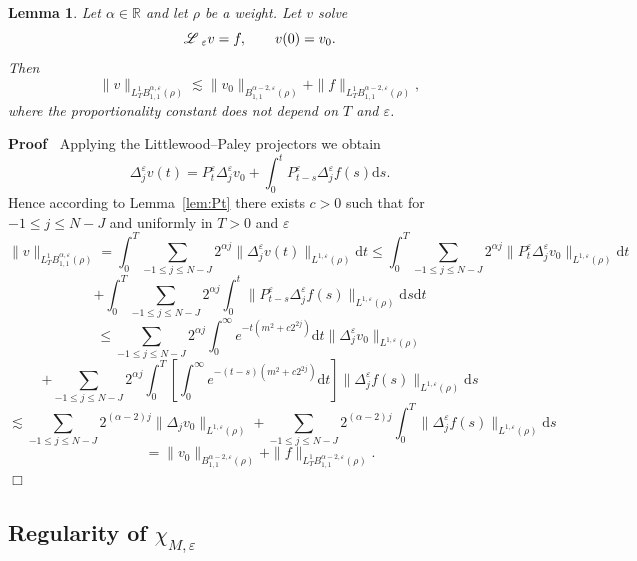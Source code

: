 \documentclass[a4paper,11pt]{article}
\newcommand{\mathd}{\mathrm{d}}
\newenvironment{proof}{\noindent\textbf{Proof\ }}{\hspace*{\fill}$\Box$\medskip}
\newtheorem{lemma}[theorem]{Lemma}
\numberwithin{equation}{section}
\newcommand{\LL}{\mathscr{L} \hspace{.2em}}
\begin{document}
\begin{lemma}
  \label{lem:reg}Let $\alpha \in \mathbb{R}$ and let $\rho$ be a weight. Let
  $v$ solve
  \[ \LL_{\varepsilon} v = f, \qquad v (0) = v_0 . \]
  Then
  \[ \| v \|_{L_T^1 B_{1, 1}^{\alpha, \varepsilon} (\rho)} \lesssim \| v_0
     \|_{B^{\alpha - 2, \varepsilon}_{1, 1} (\rho)} + \| f \|_{L^1_T B_{1,
     1}^{\alpha - 2, \varepsilon} (\rho)}, \]
  where the proportionality constant does not depend on $T$ and $\varepsilon$.
\end{lemma}

\begin{proof}
  Applying the Littlewood--Paley projectors we obtain
  \[ \Delta^{\varepsilon}_j v (t) = P^{\varepsilon}_t \Delta^{\varepsilon}_j
     v_0 + \int_0^t P^{\varepsilon}_{t - s} \Delta^{\varepsilon}_j f (s)
     \mathd s. \]
  Hence according to Lemma~\ref{lem:Pt} there exists $c > 0$ such that for $-
  1 \leqslant j \leqslant N - J$ and uniformly in $T > 0$ and $\varepsilon$
  \[ \| v \|_{L_T^1 B_{1, 1}^{\alpha, \varepsilon} (\rho)} = \int_0^T \sum_{-
     1 \leqslant j \leqslant N - J} 2^{\alpha j} \| \Delta^{\varepsilon}_j v
     (t) \|_{L^{1, \varepsilon} (\rho)} \mathd t \leqslant \int_0^T \sum_{- 1
     \leqslant j \leqslant N - J} 2^{\alpha j} \| P^{\varepsilon}_t
     \Delta^{\varepsilon}_j v_0 \|_{L^{1, \varepsilon} (\rho)} \mathd t \]
  \[ + \int_0^T \sum_{- 1 \leqslant j \leqslant N - J} 2^{\alpha j} \int_0^t
     \| P^{\varepsilon}_{t - s} \Delta^{\varepsilon}_j f (s) \|_{L^{1,
     \varepsilon} (\rho)} \mathd s \mathd t \]
  \[ \leqslant \sum_{- 1 \leqslant j \leqslant N - J} 2^{\alpha j}
     \int_0^{\infty} e^{- t (m^2 + c 2^{2 j})} \mathd t \|
     \Delta^{\varepsilon}_j v_0 \|_{L^{1, \varepsilon} (\rho)} \]
  \[ + \sum_{- 1 \leqslant j \leqslant N - J} 2^{\alpha j} \int_0^T \left[
     \int_0^{\infty} e^{- (t - s) (m^2 + c 2^{2 j})} \mathd t \right] \|
     \Delta^{\varepsilon}_j f (s) \|_{L^{1, \varepsilon} (\rho)} \mathd s \]
  \[ \lesssim \sum_{- 1 \leqslant j \leqslant N - J} 2^{(\alpha - 2) j} \|
     \Delta_j v_0 \|_{L^{1, \varepsilon} (\rho)} + \sum_{- 1 \leqslant j
     \leqslant N - J} 2^{(\alpha - 2) j} \int_0^T \| \Delta^{\varepsilon}_j f
     (s) \|_{L^{1, \varepsilon} (\rho)} \mathd s \]
  \[ = \| v_0 \|_{B^{\alpha - 2, \varepsilon}_{1, 1} (\rho)} + \| f \|_{L^1_T
     B_{1, 1}^{\alpha - 2, \varepsilon} (\rho)} . \]
\end{proof}

  
  
\subsection{Regularity of $\chi_{M,\varepsilon}$}
\label{s:chi-reg}
\end{document}
